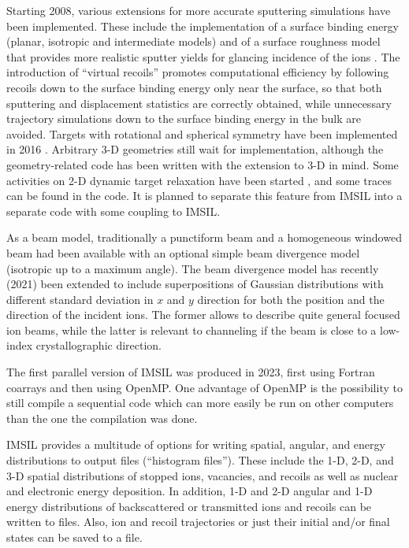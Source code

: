 Starting 2008, various extensions for more accurate sputtering simulations have 
been implemented. These include the implementation of a surface binding energy
(planar, isotropic and intermediate models) \cite{ebm_assessment_2009,
hobler_assessment_2013} and of a surface roughness model that provides more
realistic sputter yields for glancing incidence of the ions
\cite{lindsey_simple_2017}. The introduction of ``virtual recoils''
\cite{hobler_dynamic_2011} promotes computational efficiency by following
recoils down to the surface binding energy only near the surface, so that both
sputtering and displacement statistics are correctly obtained, while unnecessary
trajectory simulations down to the surface binding energy in the bulk are
avoided. Targets with rotational and spherical symmetry have been implemented in
2016 \cite{urbassek_sputtering_2018,bradley_second_2021}.
Arbitrary 3-D geometries still wait for implementation, although the 
geometry-related code has been written with the extension to 3-D in mind.
Some activities on 2-D dynamic target relaxation have been started
\cite{hobler_dynamic_2011,hobler_combined_2015}, and some traces can be found in
the code. It is planned to separate this feature from IMSIL into a separate code
with some coupling to IMSIL.

As a beam model, traditionally a punctiform beam and a homogeneous windowed beam
had been available with an optional simple beam divergence model (isotropic up
to a maximum angle). The beam divergence model has recently (2021) been
extended to include superpositions of Gaussian distributions with different
standard deviation in $x$ and $y$ direction for both the position and the
direction of the incident ions. The former allows to describe quite general
focused ion beams, while the latter is relevant to channeling if the beam is
close to a low-index crystallographic direction. 

The first parallel version of IMSIL was produced in 2023, first using Fortran 
coarrays and then using OpenMP. One advantage of OpenMP is the possibility to
still compile a sequential code which can more easily be run on other computers
than the one the compilation was done.

IMSIL provides a multitude of options for writing spatial, angular, and energy 
distributions to output files (``histogram files''). These include the 1-D, 2-D,
and 3-D spatial distributions of stopped ions, vacancies, and recoils as well as
nuclear and electronic energy deposition. In addition, 1-D and 2-D angular and
1-D energy distributions of backscattered or transmitted ions and recoils can be
written to files. Also, ion and recoil trajectories or just their initial and/or
final states can be saved to a file.

